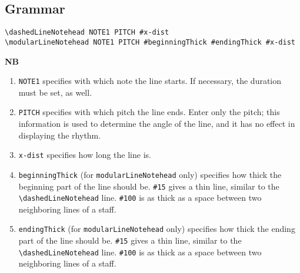 \subsection{Grammar}
\begin{verbatim}
\dashedLineNotehead NOTE1 PITCH #x-dist
\modularLineNotehead NOTE1 PITCH #beginningThick #endingThick #x-dist
\end{verbatim}

\textbf{NB} 
\begin{enumerate} 
\item \verb|NOTE1| specifies with which note the line starts. If necessary, the duration must be set, as well.
\item \verb|PITCH| specifies with which pitch the line ends. Enter only the pitch; this information is used to determine the angle of the line, and it has no effect in displaying the rhythm.  
\item \verb|x-dist| specifies how long the line is.  
\item \verb|beginningThick| (for \verb|modularLineNotehead| only) specifies how thick the beginning part of the line should be. \verb|#15| gives a thin line, similar to the \verb|\dashedLineNotehead| line. \verb|#100| is as thick as a space between two neighboring lines of a staff.
\item \verb|endingThick| (for \verb|modularLineNotehead| only) specifies how thick the ending part of the line should be. \verb|#15| gives a thin line, similar to the \verb|\dashedLineNotehead| line. \verb|#100| is as thick as a space between two neighboring lines of a staff.
\end{enumerate}

